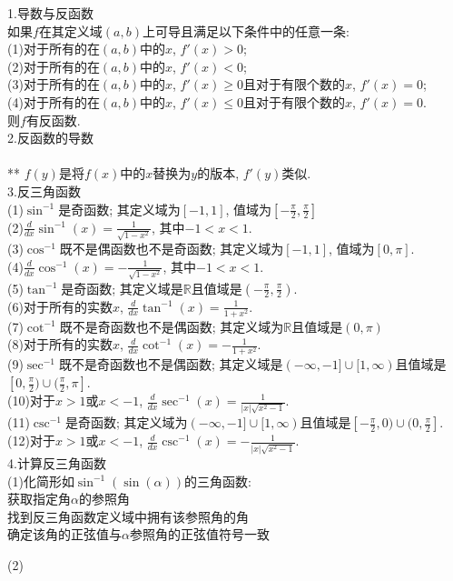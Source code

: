 \documentclass[UTF8, fontset=ubuntu]{ctexart}
\begin{document}
1.导数与反函数\\
如果$f$在其定义域$(a,b)$上可导且满足以下条件中的任意一条:\\
(1)对于所有的在$(a,b)$中的$x$, $f'(x)>0$;\\
(2)对于所有的在$(a,b)$中的$x$, $f'(x)<0$;\\
(3)对于所有的在$(a,b)$中的$x$, $f'(x)\geqslant 0$且对于有限个数的$x$, $f'(x)=0$;\\
(4)对于所有的在$(a,b)$中的$x$, $f'(x)\leqslant 0$且对于有限个数的$x$, $f'(x)=0$.\\
则$f$有反函数.\\[2ex]

2.反函数的导数\\[1ex]
\\[1ex]
** $f(y)$是将$f(x)$中的$x$替换为$y$的版本, $f'(y)$类似.\\[2ex]

3.反三角函数\\
(1)$\sin^{-1}$是奇函数; 其定义域为$[-1,1]$, 值域为$\displaystyle[-\frac{\pi}{2},\frac{\pi}{2}]$\\[1ex]
(2)$\displaystyle\frac{d}{dx}\sin^{-1}(x)=\frac{1}{\sqrt{1-x^2}}$, 其中$-1<x<1$.\\[1ex]
(3)$\cos^{-1}$既不是偶函数也不是奇函数; 其定义域为$[-1,1]$, 值域为$[0,\pi]$.\\[1ex]
(4)$\displaystyle\frac{d}{dx}\cos^{-1}(x)=-\frac{1}{\sqrt{1-x^2}}$, 其中$-1<x<1$.\\[1ex]
(5)$\tan^{-1}$是奇函数; 其定义域是$\mathbb{R}$且值域是$\displaystyle(-\frac{\pi}{2},\frac{\pi}{2})$.\\[1ex]
(6)对于所有的实数$x$, $\displaystyle\frac{d}{dx}\tan^{-1}(x)=\frac{1}{1+x^2}$.\\[1ex]
(7)$\cot^{-1}$既不是奇函数也不是偶函数; 其定义域为$\mathbb{R}$且值域是$(0,\pi)$\\[1ex]
(8)对于所有的实数$x$, $\displaystyle\frac{d}{dx}\cot^{-1}(x)=-\frac{1}{1+x^2}$.\\[1ex]
(9)$\sec^{-1}$既不是奇函数也不是偶函数; 其定义域是$(-\infty,-1]\cup[1,\infty)$且值域是$\displaystyle[0,\frac{\pi}{2})\cup(\frac{\pi}{2},\pi]$.\\[1ex]
(10)对于$x>1$或$x<-1$, $\displaystyle\frac{d}{dx}\sec^{-1}(x)=\frac{1}{|x|\sqrt{x^2-1}}$.\\[1ex]
(11)$\csc^{-1}$是奇函数; 其定义域为$(-\infty,-1]\cup[1,\infty)$且值域是$\displaystyle[-\frac{\pi}{2},0)\cup(0,\frac{\pi}{2}]$.\\[1ex]
(12)对于$x>1$或$x<-1$, $\displaystyle\frac{d}{dx}\csc^{-1}(x)=-\frac{1}{|x|\sqrt{x^2-1}}$.\\[2ex]

4.计算反三角函数\\
(1)化简形如$\sin^{-1}(\sin(\alpha))$的三角函数:\\
\phantom{(1)}获取指定角$\alpha$的参照角\\
\phantom{(1)}找到反三角函数定义域中拥有该参照角的角\\
\phantom{(1)}确定该角的正弦值与$\alpha$参照角的正弦值符号一致

(2)
\end{document}
